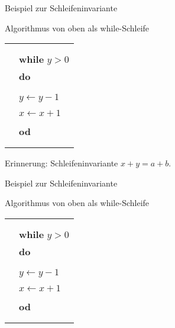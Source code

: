 \begin{frame}{Beispiel zur Schleifeninvariante}

	\begin{exampleblock}{Algorithmus von oben als while-Schleife}
	\small
		\begin{tabular}{rl}
			&\HTB{$x=a \wedge y=b$}\\
			&\HTB{...}\\
			&\textbf{while} $y > 0$\\
			&\textbf{do}\\
			&\qquad \HTB{...}\\
			&\qquad \HTB{...}\\
			&\qquad $y \leftarrow y-1$\\
			&\qquad \HTB{...}\\
			&\qquad $x \leftarrow x+1$\\
			&\qquad \HTB{...}\\
			&\textbf{od}\\
			&\HTB{...}\\
			&\HTB{$x=a+b$}\\
		\end{tabular}
		Erinnerung: Schleifeninvariante $x+y=a+b$.
	\end{exampleblock}
\end{frame}

\begin{frame}{Beispiel zur Schleifeninvariante}
	\begin{block}{Algorithmus von oben als while-Schleife}
		\small
		\begin{tabular}{rl}
			&\HTB{$x=a \wedge y=b$}\\
			&\HTB{$x+y=a+b$}\\
			&\textbf{while} $y > 0$\\
			&\textbf{do}\\
			&\qquad \HTB{$x+y=a+b \wedge y \neq 0$}\\
			&\qquad \HTB{$x+1+y-1=a+b$}\\
			&\qquad $y \leftarrow y-1$\\
			&\qquad \HTB{$x+1+y=a+b$}\\
			&\qquad $x \leftarrow x+1$\\
			&\qquad \HTB{$x+y=a+b$}\\
			&\textbf{od}\\
			&\HTB{$x+y=a+b  \wedge \neg(y \neq 0)$}\\
			&\HTB{$x=a+b$}\\
		\end{tabular}
	\end{block}
\end{frame}

